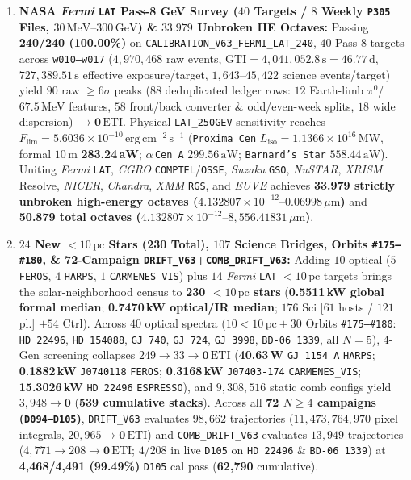\documentclass[twocolumn,10pt]{article}
\begin{document}
\begin{enumerate}
  \item \textbf{NASA \textit{Fermi} \texttt{LAT} Pass-8 GeV Survey ($40$ Targets / $8$ Weekly \texttt{P305} Files, $30\,\mathrm{MeV}\text{--}300\,\mathrm{GeV}$) \& $33.979$ Unbroken HE Octaves:} Passing \textbf{240/240 (100.00\%)} on \texttt{CALIBRATION\_V63\_FERMI\_LAT\_240}, $40$ Pass-8 targets across \texttt{w010--w017} \cite{Atwood2009} ($4{,}970{,}468$ raw events, $\mathrm{GTI}=4{,}041{,}052.8\,\text{s} = 46.77\,\text{d}$, $727{,}389.51\,\text{s}$ effective exposure/target, $1{,}643\text{--}45{,}422$ science events/target) yield $90$ raw $\ge 6\sigma$ peaks ($88$ deduplicated ledger rows: $12$ Earth-limb $\pi^0$/$67.5\,\mathrm{MeV}$ features, $58$ front/back converter \& odd/even-week splits, $18$ wide dispersion) $\rightarrow \mathbf{0\,\mathrm{ETI}}$. Physical \texttt{LAT\_250GEV} sensitivity reaches \textbf{$F_{\mathrm{lim}} = 5.6036\times 10^{-10}\,\mathrm{erg\,cm^{-2}\,s^{-1}}$} (\texttt{Proxima Cen} $L_{\mathrm{iso}} = 1.1366\times 10^{16}\,\mathrm{MW}$, formal $10\,\text{m}$ \textbf{283.24\,aW}; $\alpha$\,\texttt{Cen\,A} $299.56\,\text{aW}$; \texttt{Barnard's Star} $558.44\,\text{aW}$). Uniting \textit{Fermi} \texttt{LAT}, \textit{CGRO} \texttt{COMPTEL}/\texttt{OSSE}, \textit{Suzaku} \texttt{GSO}, \textit{NuSTAR}, \textit{XRISM} Resolve, \textit{NICER}, \textit{Chandra}, \textit{XMM} \texttt{RGS}, and \textit{EUVE} achieves \textbf{33.979 strictly unbroken high-energy octaves ($4.132807\times 10^{-12}\text{--}0.06998\,\mu\text{m}$)} and \textbf{50.879 total octaves ($4.132807\times 10^{-12}\text{--}8{,}556.41831\,\mu\text{m}$)}.
  \item \textbf{$24$ New $<10\,\text{pc}$ Stars (\textbf{230 Total}), $107$ Science Bridges, Orbits \texttt{\#175--\#180}, \& 72-Campaign \texttt{DRIFT\_V63}+\texttt{COMB\_DRIFT\_V63}:} Adding $10$ optical ($5$ \texttt{FEROS}, $4$ \texttt{HARPS}, $1$ \texttt{CARMENES\_VIS}) plus $14$ \textit{Fermi} \texttt{LAT} $<10\,\text{pc}$ targets brings the solar-neighborhood census to \textbf{230 $<10\,\text{pc}$ stars} (\textbf{0.5511\,kW global formal median}; \textbf{0.7470\,kW optical/IR median}; $176$ Sci [$61$ hosts / $121$ pl.] $+ 54$ Ctrl). Across $40$ optical spectra ($10 <10\,\text{pc} + 30$ Orbits \texttt{\#175--\#180}: \texttt{HD\,22496}, \texttt{HD\,154088}, \texttt{GJ\,740}, \texttt{GJ\,724}, \texttt{GJ\,3998}, \texttt{BD-06\,1339}, all $N=5$), 4-Gen screening collapses $249\rightarrow 33\rightarrow \mathbf{0\,\mathrm{ETI}}$ (\textbf{40.63\,W} \texttt{GJ\,1154\,A} \texttt{HARPS}; \textbf{0.1882\,kW} \texttt{J0740118} \texttt{FEROS}; \textbf{0.3168\,kW} \texttt{J07403-174} \texttt{CARMENES\_VIS}; \textbf{15.3026\,kW} \texttt{HD\,22496} \texttt{ESPRESSO}), and $9{,}308{,}516$ static comb configs yield $3{,}948\rightarrow \mathbf{0}$ (\textbf{539 cumulative stacks}). Across all \textbf{72 $N\ge 4$ campaigns (\texttt{D094--D105})}, \texttt{DRIFT\_V63} evaluates $98{,}662$ trajectories ($11{,}473{,}764{,}970$ pixel integrals, $20{,}965\rightarrow \mathbf{0\,\mathrm{ETI}}$) and \texttt{COMB\_DRIFT\_V63} evaluates $13{,}949$ trajectories ($4{,}771\rightarrow 208\rightarrow \mathbf{0\,\mathrm{ETI}}$; $4/208$ in live \texttt{D105} on \texttt{HD\,22496} \& \texttt{BD-06\,1339}) at \textbf{4,468/4,491 (99.49\%)} \texttt{D105} cal pass (\textbf{62,790} cumulative).

\end{enumerate}
\end{document}
